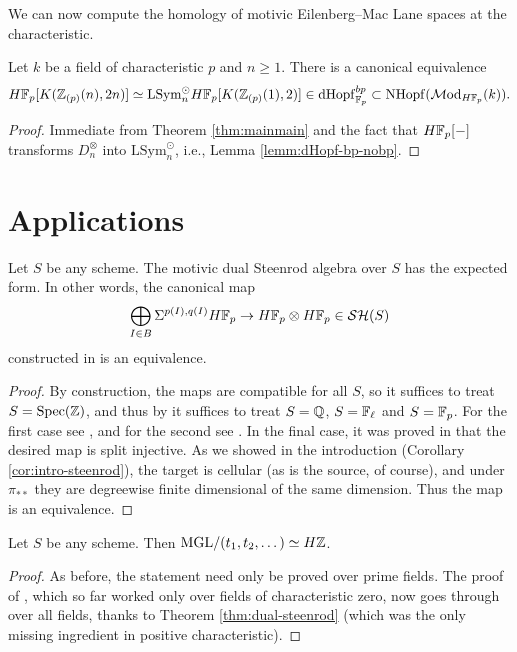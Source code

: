 \documentclass{amsart}
\renewcommand{\todo}[1]{}
\numberwithin{proposition}{section}
\numberwithin{equation}{section}
\def\LSym{\mathrm{LSym}}
\def\NHopf{\mathrm{NHopf}}
\def\dHopf{\mathrm{dHopf}}
\def\hotimes{\odot}
\begin{document}
We can now compute the homology of motivic Eilenberg--Mac Lane spaces at the characteristic.
\begin{corollary} \label{cor:EM-homology}
Let $k$ be a field of characteristic $p$ and $n \ge 1$.
There is a canonical equivalence \[ H\F_p[K(\Z_{(p)}(n),2n)] \wequi \LSym_n^\hotimes H\F_p[K(\Z_{(p)}(1),2)] \in \dHopf_{\F_p}^{bp} \subset \NHopf(\Mod_{H\F_p}(k)). \]
\end{corollary}
\begin{proof}
Immediate from Theorem \ref{thm:mainmain} and the fact that $H\mathbb{F}_p[\mathord-]$ transforms $D_n^\otimes$ into $\LSym_n^\hotimes$, i.e., Lemma \ref{lemm:dHopf-bp-nobp}.
\end{proof}

\section{Applications} \label{sec:applications} \todo{most proofs somewhat sketchy}

\begin{theorem} \label{thm:dual-steenrod}
Let $S$ be any scheme.
The motivic dual Steenrod algebra over $S$ has the expected form.
In other words, the canonical map \[ \bigoplus_{I \in B}\Sigma^{p(I),q(I)} H\mathbb{F}_p \to H\mathbb{F}_p \otimes H\mathbb{F}_p \in \mathcal{SH}(S) \] constructed in \cite[Theorem 10.26]{spitzweck2012commutative} is an equivalence.
\end{theorem}
\begin{proof}
By construction, the maps are compatible for all $S$, so it suffices to treat $S=\mathrm{Spec}(\mathbb{Z})$, and thus by \cite[Proposition~B.3]{bachmann-norms} it suffices to treat $S=\mathbb{Q}$, $S=\mathbb{F}_\ell$ and $S=\mathbb{F}_p$.
For the first case see \cite{voevodsky2003reduced, voevodsky2010motivic}, and for the second see \cite[Theorem~1.1]{motivic-steenrod}.
In the final case, it was proved in \cite[Theorem~1.2]{frankland-spitzweck} that the desired map is split injective.
As we showed in the introduction (Corollary \ref{cor:intro-steenrod}), the target is cellular (as is the source, of course), and under $\pi_{**}$ they are degreewise finite dimensional of the same dimension.
Thus the map is an equivalence.
\end{proof}

\begin{theorem} \label{thm:hopkins-morel}
Let $S$ be any scheme.
Then $\mathrm{MGL}/(t_1, t_2, \dots) \simeq H\mathbb{Z}$.
\end{theorem}
\begin{proof}
As before, the statement need only be proved over prime fields.
The proof of \cite[\S7]{hoyois-algebraic-cobordism}, which so far worked only over fields of characteristic zero, now goes through over all fields, thanks to Theorem \ref{thm:dual-steenrod} (which was the only missing ingredient in positive characteristic).
\end{proof}
\end{document}
